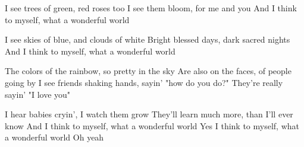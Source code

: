 

I see trees of green, red roses too
I see them bloom, for me and you
And I think to myself, what a wonderful world

I see skies of blue, and clouds of white
Bright blessed days, dark sacred nights
And I think to myself, what a wonderful world

The colors of the rainbow, so pretty in the sky
Are also on the faces, of people going by
I see friends shaking hands, sayin' "how do you do?"
They're really sayin' "I love you"

I hear babies cryin', I watch them grow
They'll learn much more, than I'll ever know
And I think to myself, what a wonderful world
Yes I think to myself, what a wonderful world
Oh yeah 